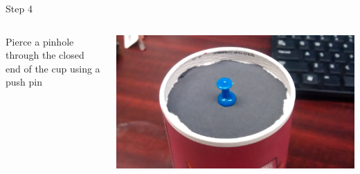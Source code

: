 \begin{frame}{Step 4}
  \begin{columns}
    \begin{column}{0.6\textwidth}
      Pierce a pinhole through the closed end of the cup using a push pin
    \end{column}
    \begin{column}{0.4\textwidth}
      \includegraphics[width=\textwidth]{media/pushpin.jpg}
    \end{column}
  \end{columns}
\end{frame}

